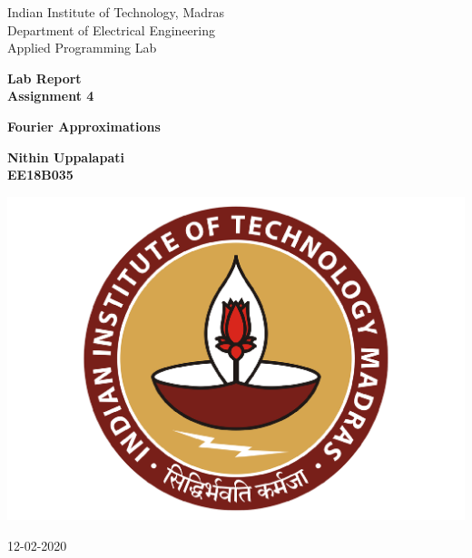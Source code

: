 \documentclass[10pt,english, openany]{book}
\begin{document}

\begin{titlepage}
	\clearpage\thispagestyle{empty}
	\centering
	\vspace{1cm}

	{\Large Indian Institute of Technology, Madras \\ 
		Department of Electrical Engineering \\
		Applied Programming Lab \par}
		\vspace{3cm}
	{\LARGE \textbf{Lab Report}} \\
    \LARGE \textbf{Assignment 4} \\
	{\Huge \textbf{Fourier Approximations} \par}
	\vspace{3cm}
	{\large \textbf{Nithin Uppalapati} \\ 
     \large \textbf{EE18B035} \\%
	\vspace{2cm}
    
    \centering \includegraphics[scale=0.2]{IITm.pdf}
%     
    \vspace{1.5cm}
		
	{\normalsize 12-02-2020 \par}
	
	\pagebreak
}
\end{titlepage}
\end{document}

